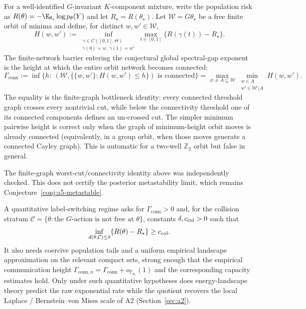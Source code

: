 \documentclass[../../main.tex]{subfiles}
\begin{document}
For a well-identified $G$-invariant $K$-component mixture, write the population risk as
$R(\theta)=-\E_{\theta_\star}\log p_\theta(Y)$ and let $R_\star=R(\theta_\star)$. Let
$\mathcal W=G\theta_\star$ be a free finite orbit of minima and define, for distinct
$w,w'\in\mathcal W$,
\[
 H(w,w'):=\inf_{\substack{\gamma\in C([0,1],\Theta)\\
                   \gamma(0)=w,\ \gamma(1)=w'}}
 \max_{t\in[0,1]}\{R(\gamma(t))-R_\star\}.
\]
The finite-network barrier entering the conjectural global spectral-gap exponent is the height at
which the entire orbit network becomes connected:
\begin{equation}\label{eq:a5-barrier}
 \Gamma_{\mathrm{conn}}
 :=\inf\{h:\ (\mathcal W,\{\{w,w'\}:H(w,w')\le h\})\text{ is connected}\}
 =\max_{\varnothing\ne A\subsetneq\mathcal W}
   \min_{\substack{w\in A\\w'\in\mathcal W\setminus A}}H(w,w').
\end{equation}
The equality is the finite-graph bottleneck identity: every connected threshold graph crosses
every nontrivial cut, while below the connectivity threshold one of its connected components
defines an un-crossed cut. The simpler minimum pairwise height is correct only when the graph of
minimum-height orbit moves is already connected (equivalently, in a group orbit, when those moves
generate a connected Cayley graph). This is automatic for a two-well $\mathbb Z_2$ orbit but
false in general.

\noindent The finite-graph worst-cut/connectivity identity above was independently checked. This
does not certify the posterior metastability limit, which remains Conjecture~\ref{conj:a5-metastable}.

A quantitative label-switching regime asks for $\Gamma_{\mathrm{conn}}>0$ and, for the collision stratum
$\mathcal C=\{\theta:\text{the $G$-action is not free at $\theta$}\}$, constants
$\delta,c_{\rm col}>0$ such that
\[
 \inf_{d(\theta,\mathcal C)\le\delta}\{R(\theta)-R_\star\}\ge c_{\rm col}.
\]
It also needs coercive population tails and a uniform empirical landscape approximation on the
relevant compact sets, strong enough that the empirical communication height
$\Gamma_{\mathrm{conn},n}=\Gamma_{\mathrm{conn}}+o_{\mathbb P_{\theta_\star}}(1)$ and the
corresponding capacity estimates hold.
Only under such quantitative hypotheses does energy-landscape theory
\cite{MenzSchlichting2014} predict the raw exponential rate while the quotient recovers the local
Laplace / Bernstein--von Mises scale of A2 (Section~\ref{sec:a2}).
\end{document}
